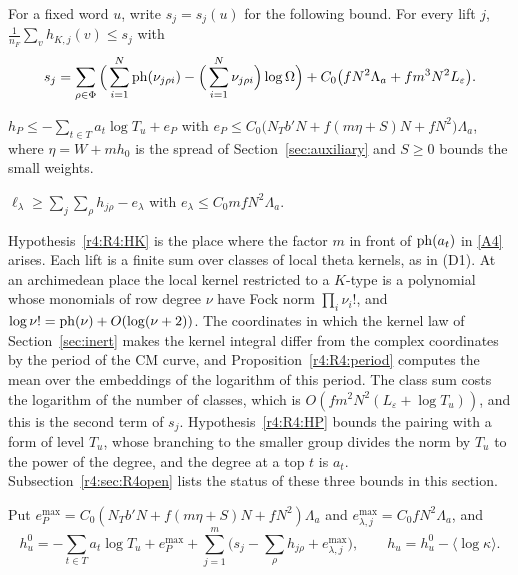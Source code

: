 \begin{hypothesis}\label{r4:R4:HK}
For a fixed word $u$, write $s_j=s_j(u)$ for the following bound. For every lift $j$, $\frac1{n_F}\sum_vh_{K,j}(v)\le s_j$ with
\[
s_j=\sum_{\rho\in\Phi}\Big(\sum_{i=1}^N\operatorname{ph}(\nu_{j\rho i})-\Big(\sum_{i=1}^N\nu_{j\rho i}\Big)\log\Omega\Big)+C_0\big(fN^2\Lambda_a+fm^3N^2L_\varepsilon\big).
\]
\end{hypothesis}

\begin{hypothesis}\label{r4:R4:HP}
$h_P\le-\sum_{t\in T}a_t\log T_u+e_P$ with $e_P\le C_0\big(N_Tb'N+f(m\eta+S)N+fN^2\big)\Lambda_a$, where $\eta=W+mh_0$ is the spread of Section~\ref{sec:auxiliary} and $S\ge0$ bounds the small weights.
\end{hypothesis}

\begin{hypothesis}\label{r4:R4:HL}
$\ell_\lambda\ge\sum_j\sum_\rho h_{j\rho}-e_\lambda$ with $e_\lambda\le C_0mfN^2\Lambda_a$.
\end{hypothesis}

\begin{remark}\label{r4:R4:HKmech}
Hypothesis~\ref{r4:R4:HK} is the place where the factor $m$ in front of $\operatorname{ph}(a_t)$ in \eqref{A4} arises. Each lift is a finite sum over classes of local theta kernels, as in (D1). At an archimedean place the local kernel restricted to a $K$-type is a polynomial whose monomials of row degree $\nu$ have Fock norm $\prod_i\nu_i!$, and $\log\nu!=\operatorname{ph}(\nu)+O(\log(\nu+2))$. The coordinates in which the kernel law of Section~\ref{sec:inert} makes the kernel integral differ from the complex coordinates by the period of the CM curve, and Proposition~\ref{r4:R4:period} computes the mean over the embeddings of the logarithm of this period. The class sum costs the logarithm of the number of classes, which is $O(fm^2N^2(L_\varepsilon+\log T_u))$, and this is the second term of $s_j$. Hypothesis~\ref{r4:R4:HP} bounds the pairing with a form of level $T_u$, whose branching to the smaller group divides the norm by $T_u$ to the power of the degree, and the degree at a top $t$ is $a_t$. Subsection~\ref{r4:sec:R4open} lists the status of these three bounds in this section.
\end{remark}

\begin{definition}\label{r4:R4:hu}
Put $e_P^{\max}=C_0(N_Tb'N+f(m\eta+S)N+fN^2)\Lambda_a$ and $e^{\max}_{\lambda,j}=C_0fN^2\Lambda_a$, and
\[
h^0_u=-\sum_{t\in T}a_t\log T_u+e_P^{\max}+\sum_{j=1}^m\Big(s_j-\sum_\rho h_{j\rho}+e^{\max}_{\lambda,j}\Big),\qquad h_u=h^0_u-\langle\log\kappa\rangle .
\]
\end{definition}

